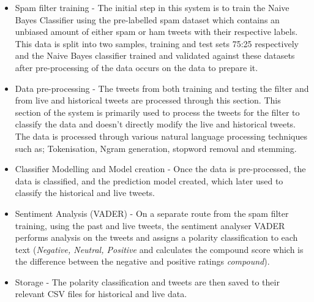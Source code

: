 \documentclass[oneside, 12pt]{article}
\begin{document}
		\begin{itemize}
			\item Spam filter training - The initial step in this system is to train the Naive Bayes Classifier using the pre-labelled spam dataset which contains an unbiased amount of either spam or ham tweets with their respective labels.
			\subitem This data is split into two samples, training and test sets 75:25 respectively and the Naive Bayes classifier trained and validated against these datasets after pre-processing of the data occurs on the data to prepare it.
			\item Data pre-processing - The tweets from both training and testing the filter and from live and historical tweets are processed through this section. 
			\subitem This section of the system is primarily used to process the tweets for the filter to classify the data and doesn't directly modify the live and historical tweets. The data is processed through various natural language processing techniques such as; Tokenisation, Ngram generation, stopword removal and stemming.
			\item Classifier Modelling and Model creation - Once the data is pre-processed, the data is classified, and the prediction model created, which later used to classify the historical and live tweets.
			\item Sentiment Analysis (VADER) - On a separate route from the spam filter training, using the past and live tweets, the sentiment analyser VADER performs analysis on the tweets and assigns a polarity classification to each text (\textit{Negative, Neutral, Positive} and calculates the compound score which is the difference between the negative and positive ratings \textit{compound}).
			\item Storage - The polarity classification and tweets are then saved to their relevant CSV files for historical and live data.
		\end{itemize}
	
	\newpage
	
\end{document}
